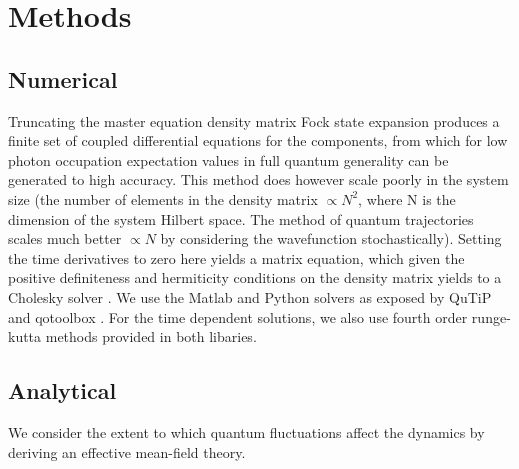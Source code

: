 \section{Methods}
\subsection{Numerical}
Truncating the master equation density matrix Fock state expansion produces a finite set of coupled differential equations for the components, from which for low photon occupation expectation values in full quantum generality can be generated to high accuracy.
This method does however scale poorly in the system size (the number of elements in the density matrix $\propto N^2$, where N is the dimension of the system Hilbert space.
The method of quantum trajectories scales much better \cite{Molmer1993} $\propto N$ by considering the wavefunction stochastically).
Setting the time derivatives to zero here yields a matrix equation, which given the positive definiteness and hermiticity conditions on the density matrix yields to a Cholesky solver \cite{Press1992}.
We use the Matlab and Python solvers as exposed by QuTiP \cite{Johansson2013a} and qotoolbox \cite{Tan}. For the time dependent solutions, we also use fourth order runge-kutta methods provided in both libaries.
\subsection{Analytical}
We consider the extent to which quantum fluctuations affect the dynamics by deriving an effective mean-field theory.

